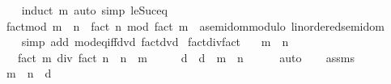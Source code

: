 \begin{isabellebody}
%
\isadelimproof
\ \ %
\endisadelimproof
%
\isatagproof
{}\isamarkupfalse%
\ {\isacharparenleft}{\kern0pt}induct\ m{\isacharparenright}{\kern0pt}\ {\isacharparenleft}{\kern0pt}auto\ simp{\isacharcolon}{\kern0pt}\ le{\isacharunderscore}{\kern0pt}Suc{\isacharunderscore}{\kern0pt}eq{\isacharparenright}{\kern0pt}%
\endisatagproof
{\isafoldproof}%
%
\isadelimproof
\isanewline
%
\endisadelimproof
\isanewline
{}\isamarkupfalse%
\ fact{\isacharunderscore}{\kern0pt}mod{\isacharcolon}{\kern0pt}\ {\isachardoublequoteopen}m\ {\isasymle}\ n\ {\isasymLongrightarrow}\ fact\ n\ mod\ {\isacharparenleft}{\kern0pt}fact\ m\ {\isacharcolon}{\kern0pt}{\isacharcolon}{\kern0pt}\ {\isacharprime}{\kern0pt}a{\isacharcolon}{\kern0pt}{\isacharcolon}{\kern0pt}{\isacharbraceleft}{\kern0pt}semidom{\isacharunderscore}{\kern0pt}modulo{\isacharcomma}{\kern0pt}\ linordered{\isacharunderscore}{\kern0pt}semidom{\isacharbraceright}{\kern0pt}{\isacharparenright}{\kern0pt}\ {\isacharequal}{\kern0pt}\ {}{\isachardoublequoteclose}\isanewline
%
\isadelimproof
\ \ %
\endisadelimproof
%
\isatagproof
{}\isamarkupfalse%
\ {\isacharparenleft}{\kern0pt}simp\ add{\isacharcolon}{\kern0pt}\ mod{\isacharunderscore}{\kern0pt}eq{\isacharunderscore}{\kern0pt}{}{\isacharunderscore}{\kern0pt}iff{\isacharunderscore}{\kern0pt}dvd\ fact{\isacharunderscore}{\kern0pt}dvd{\isacharparenright}{\kern0pt}%
\endisatagproof
{\isafoldproof}%
%
\isadelimproof
\isanewline
%
\endisadelimproof
\isanewline
{}\isamarkupfalse%
\ fact{\isacharunderscore}{\kern0pt}div{\isacharunderscore}{\kern0pt}fact{\isacharcolon}{\kern0pt}\isanewline
\ \ \ {\isachardoublequoteopen}m\ {\isasymge}\ n{\isachardoublequoteclose}\isanewline
\ \ \ {\isachardoublequoteopen}fact\ m\ div\ fact\ n\ {\isacharequal}{\kern0pt}\ {\isasymProd}{\isacharbraceleft}{\kern0pt}n\ {\isacharplus}{\kern0pt}\ {}{\isachardot}{\kern0pt}{\isachardot}{\kern0pt}m{\isacharbraceright}{\kern0pt}{\isachardoublequoteclose}\isanewline
%
\isadelimproof
%
\endisadelimproof
%
\isatagproof
{}\isamarkupfalse%
\ {\isacharminus}{\kern0pt}\isanewline
\ \ \isamarkupfalse%
\ d\ \ {\isachardoublequoteopen}d\ {\isacharequal}{\kern0pt}\ m\ {\isacharminus}{\kern0pt}\ n{\isachardoublequoteclose}\isanewline
\ \ \ \ \isamarkupfalse%
\ auto\isanewline
\ \ \isamarkupfalse%
\ assms\ \isamarkupfalse%
\ {\isachardoublequoteopen}m\ {\isacharequal}{\kern0pt}\ n\ {\isacharplus}{\kern0pt}\ d{\isachardoublequoteclose}\isanewline

\end{isabellebody}
